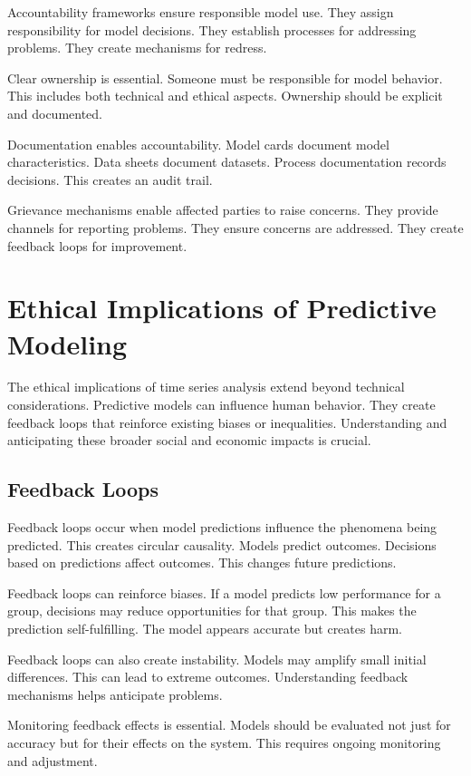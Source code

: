 Accountability frameworks ensure responsible model use. They assign responsibility for model decisions. They establish processes for addressing problems. They create mechanisms for redress.

Clear ownership is essential. Someone must be responsible for model behavior. This includes both technical and ethical aspects. Ownership should be explicit and documented.

Documentation enables accountability. Model cards document model characteristics. Data sheets document datasets. Process documentation records decisions. This creates an audit trail.

Grievance mechanisms enable affected parties to raise concerns. They provide channels for reporting problems. They ensure concerns are addressed. They create feedback loops for improvement.

\section{Ethical Implications of Predictive Modeling}

The ethical implications of time series analysis extend beyond technical considerations. Predictive models can influence human behavior. They create feedback loops that reinforce existing biases or inequalities. Understanding and anticipating these broader social and economic impacts is crucial.

\subsection{Feedback Loops}

Feedback loops occur when model predictions influence the phenomena being predicted. This creates circular causality. Models predict outcomes. Decisions based on predictions affect outcomes. This changes future predictions.

Feedback loops can reinforce biases. If a model predicts low performance for a group, decisions may reduce opportunities for that group. This makes the prediction self-fulfilling. The model appears accurate but creates harm.

Feedback loops can also create instability. Models may amplify small initial differences. This can lead to extreme outcomes. Understanding feedback mechanisms helps anticipate problems.

Monitoring feedback effects is essential. Models should be evaluated not just for accuracy but for their effects on the system. This requires ongoing monitoring and adjustment.


